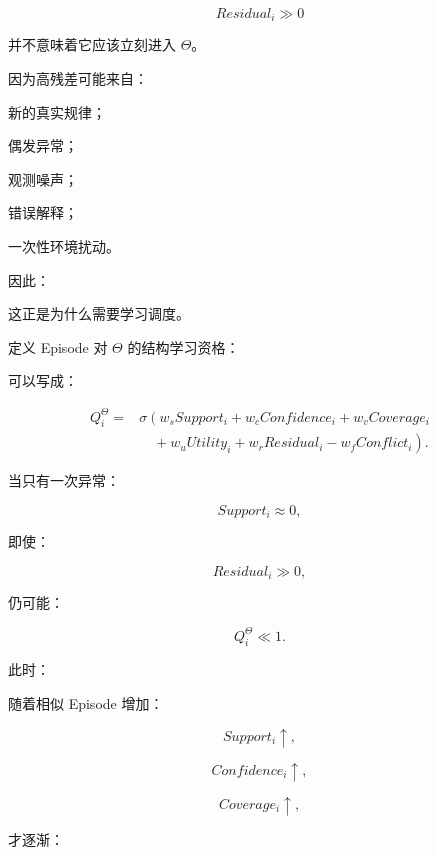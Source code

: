 \[
Residual_i\gg0
\]

并不意味着它应该立刻进入 \(\Theta\)。

因为高残差可能来自：

新的真实规律；

偶发异常；

观测噪声；

错误解释；

一次性环境扰动。

因此：

\begin{statementbox}
\centering
{}
\end{statementbox}

这正是为什么需要学习调度。

定义 Episode 对 \(\Theta\) 的结构学习资格：

\begin{statementbox}
\centering
{}
\end{statementbox}

可以写成：

\[
\begin{aligned}
Q_i^\Theta
={}&
\sigma
\left(
w_sSupport_i
+
w_cConfidence_i
+
w_vCoverage_i
{}\right.\\
&\left.\quad+
w_uUtility_i
+
w_rResidual_i
-
w_fConflict_i
\right).
\end{aligned}
\]

当只有一次异常：

\[
Support_i\approx0,
\]

即使：

\[
Residual_i\gg0,
\]

仍可能：

\[
Q_i^\Theta\ll1.
\]

此时：

\begin{statementbox}
\centering
{}
\end{statementbox}

随着相似 Episode 增加：

\[
Support_i\uparrow,
\]

\[
Confidence_i\uparrow,
\]

\[
Coverage_i\uparrow,
\]

才逐渐：

